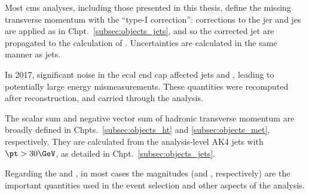 Most \acrshort{cms} analyses, including those presented in this thesis, define the missing transverse momentum with the ``type-I correction'': corrections to the \acrshort{jer} and \acrshort{jes} are applied as in Chpt.~\ref{subsec:objects_jets}, and so the corrected \gls{jet} \ptvec are propagated to the calculation of \ptvecmiss. Uncertainties are calculated in the same manner as \glspl{jet}.

In 2017, significant noise in the \acrshort{ecal} end cap affected \glspl{jet} and \ptmiss, leading to potentially large energy mismeasurements. These quantities were recomputed after reconstruction, and carried through the analysis.

The scalar sum \HT and negative vector sum of hadronic transverse momentum \htvecmiss are broadly defined in Chpts.~\ref{subsec:objects_ht} and \ref{subsec:objects_met}, respectively. They are calculated from the analysis-level AK4 jets with $\pt > \text{30}\GeV$, as detailed in Chpt.~\ref{subsec:objects_jets}.

Regarding the \ptvecmiss and \htvecmiss, in most cases the magnitudes (\ptmiss and \mht, respectively) are the important quantities used in the event selection and other aspects of the analysis.


